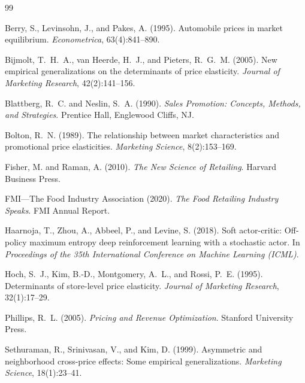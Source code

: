 \documentclass[11pt,a4paper]{article}
\begin{document}
\begin{thebibliography}{99}

Berry, S., Levinsohn, J., and Pakes, A. (1995).
\newblock Automobile prices in market equilibrium.
\newblock \emph{Econometrica}, 63(4):841--890.

Bijmolt, T.~H.~A., van Heerde, H.~J., and Pieters, R.~G.~M. (2005).
\newblock New empirical generalizations on the determinants of price elasticity.
\newblock \emph{Journal of Marketing Research}, 42(2):141--156.

Blattberg, R.~C. and Neslin, S.~A. (1990).
\newblock \emph{Sales Promotion: Concepts, Methods, and Strategies}.
\newblock Prentice Hall, Englewood Cliffs, NJ.

Bolton, R.~N. (1989).
\newblock The relationship between market characteristics and promotional price elasticities.
\newblock \emph{Marketing Science}, 8(2):153--169.

Fisher, M. and Raman, A. (2010).
\newblock \emph{The New Science of Retailing}.
\newblock Harvard Business Press.

FMI---The Food Industry Association (2020).
\newblock \emph{The Food Retailing Industry Speaks}.
\newblock FMI Annual Report.

Haarnoja, T., Zhou, A., Abbeel, P., and Levine, S. (2018).
\newblock Soft actor-critic: Off-policy maximum entropy deep reinforcement learning with a stochastic actor.
\newblock In \emph{Proceedings of the 35th International Conference on Machine Learning (ICML)}.

Hoch, S.~J., Kim, B.-D., Montgomery, A.~L., and Rossi, P.~E. (1995).
\newblock Determinants of store-level price elasticity.
\newblock \emph{Journal of Marketing Research}, 32(1):17--29.

Phillips, R.~L. (2005).
\newblock \emph{Pricing and Revenue Optimization}.
\newblock Stanford University Press.

Sethuraman, R., Srinivasan, V., and Kim, D. (1999).
\newblock Asymmetric and neighborhood cross-price effects: Some empirical generalizations.
\newblock \emph{Marketing Science}, 18(1):23--41.


\end{thebibliography}
\end{document}
